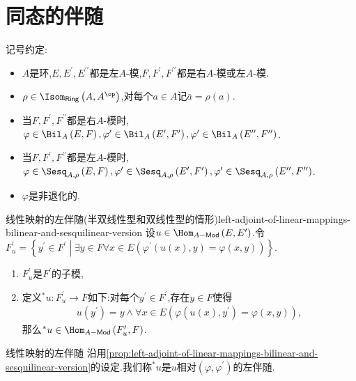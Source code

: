 \section{同态的伴随}

记号约定:
\begin{itemize}
	\item $A$是环,$E,E^{\prime},E^{\prime\prime}$都是左$A$-模,$F,F^{\prime},F^{\prime\prime}$都是右$A$-模或左$A$-模.
	\item $\rho\in\Isom_{\mathsf{Ring}}\left(A,A^{\op}\right)$,对每个$a\in A$记$\bar{a}=\rho\left(a\right)$.
	\item 当$F,F^{\prime},F^{\prime\prime}$都是右$A$-模时,$\varphi\in\Bil_{A}\left(E,F\right),\varphi^{\prime}\in\Bil_{A}\left(E^{\prime},F^{\prime}\right),\varphi^{\prime}\in\Bil_{A}\left(E^{\prime\prime},F^{\prime\prime}\right)$.
	\item 当$F,F^{\prime},F^{\prime\prime}$都是左$A$-模时,$\varphi\in\Sesq_{A,\rho}\left(E,F\right),\varphi^{\prime}\in\Sesq_{A,\rho}\left(E^{\prime},F^{\prime}\right),\varphi^{\prime}\in\Sesq_{A,\rho}\left(E^{\prime\prime},F^{\prime\prime}\right)$.
	\item $\varphi$是非退化的.
\end{itemize}

\begin{proposition}{线性映射的左伴随(半双线性型和双线性型的情形)}{left-adjoint-of-linear-mappings-bilinear-and-sesquilinear-version}
	设$u\in\Hom_{A-\mathsf{Mod}}\left(E,E^{\prime}\right)$.令$F_{u}^{\prime}=\left\{y^{\prime}\in F^{\prime}\middle|\exists y\in F\forall x\in E\left(\varphi^{\prime}\left(u\left(x\right),y\right)=\varphi\left(x,y\right)\right)\right\}$.
	\begin{enumerate}
		\item $F_{u}^{\prime}$是$F^{\prime}$的子模,
		\item 定义${}^{\ast}u:F_{u}^{\prime}\to F$如下:对每个$y^{\prime}\in F^{\prime}$,存在$y\in F$使得
		\begin{align*}
			u\left(y^{\prime}\right)=y\wedge\forall x\in E\left(\varphi\left(u\left(x\right),y^{\prime}\right)=\varphi\left(x,y\right)\right),
		\end{align*}
		那么${}^{\ast}u\in\Hom_{A-\mathsf{Mod}}\left(F_{u}^{\prime},F\right)$.
	\end{enumerate}
\end{proposition}

\begin{definition}{线性映射的左伴随}{}
	沿用\cref{prop:left-adjoint-of-linear-mappings-bilinear-and-sesquilinear-version}的设定.我们称${}^{\ast}u$是$u$相对$\left(\varphi,\varphi^{\prime}\right)$的左伴随.
\end{definition}

